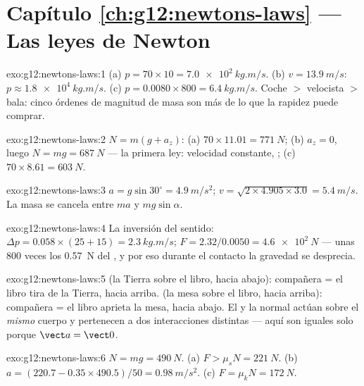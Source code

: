 \section*{Capítulo \ref{ch:g12:newtons-laws} --- Las leyes de Newton}

\begin{solution}{exo:g12:newtons-laws:1}
(a) $p = 70 \times 10 = \qty{7.0e2}{kg.m/s}$.
(b) $v = \qty{13.9}{m/s}$: $p \approx \qty{1.8e4}{kg.m/s}$.
(c) $p = 0.0080 \times 800 = \qty{6.4}{kg.m/s}$. Coche $>$ velocista $>$
bala: cinco órdenes de magnitud de masa son más de lo que la rapidez
puede comprar.
\end{solution}

\begin{solution}{exo:g12:newtons-laws:2}
$N = m(g + a_z)$: (a) $70 \times 11.01 = \qty{771}{N}$;
(b) $a_z = 0$, luego $N = mg = \qty{687}{N}$ --- la primera ley:
velocidad constante, ;
(c) $70 \times 8.61 = \qty{603}{N}$.
\end{solution}

\begin{solution}{exo:g12:newtons-laws:3}
$a = g\sin 30^\circ = \qty{4.9}{m/s^2}$;
$v = \sqrt{2 \times 4.905 \times 3.0} = \qty{5.4}{m/s}$. La masa se
cancela entre $ma$ y $mg\sin\alpha$.
\end{solution}

\begin{solution}{exo:g12:newtons-laws:4}
La inversión del sentido:
$\Delta p = 0.058 \times (25 + 15) = \qty{2.3}{kg.m/s}$;
$F = 2.32/0.0050 = \qty{4.6e2}{N}$ --- unas $800$ veces los
\qty{0.57}{N} del , y por eso durante el contacto la gravedad se
desprecia.
\end{solution}

\begin{solution}{exo:g12:newtons-laws:5}
 (la Tierra sobre el libro, hacia abajo): compañera = el libro tira
de la Tierra, hacia arriba.  (la mesa sobre el libro,
hacia arriba): compañera = el libro aprieta la mesa, hacia abajo. El
 y la normal actúan sobre el \emph{mismo} cuerpo y pertenecen a dos
interacciones distintas --- aquí son iguales solo porque
$\vect a = \vect 0$.
\end{solution}

\begin{solution}{exo:g12:newtons-laws:6}
$N = mg = \qty{490}{N}$. (a) $F > \mu_s N = \qty{221}{N}$.
(b) $a = (220.7 - 0.35 \times 490.5)/50 = \qty{0.98}{m/s^2}$.
(c) $F = \mu_k N = \qty{172}{N}$.
\end{solution}

